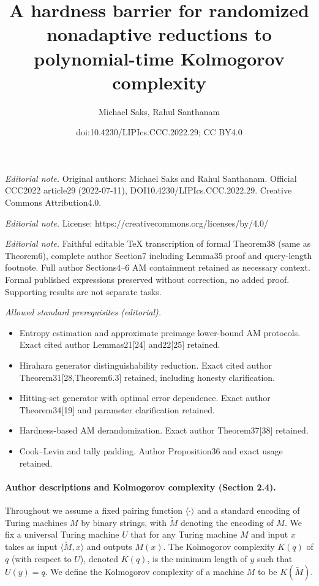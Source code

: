 \documentclass[10pt,a4paper]{article}
\title{A hardness barrier for randomized nonadaptive reductions to polynomial-time Kolmogorov complexity}
\author{Michael Saks, Rahul Santhanam}
\date{doi:10.4230/LIPIcs.CCC.2022.29; CC BY4.0}
\begin{document}
\maketitle
\noindent\textit{Editorial note.} Original authors: Michael Saks and Rahul Santhanam. Official CCC2022 article29 (2022-07-11), DOI10.4230/LIPIcs.CCC.2022.29. Creative Commons Attribution4.0.\par\medskip
\noindent\textit{Editorial note.} License: https://creativecommons.org/licenses/by/4.0/\par\medskip
\noindent\textit{Editorial note.} Faithful editable TeX transcription of formal Theorem38 (same as Theorem6), complete author Section7 including Lemma35 proof and query-length footnote. Full author Sections4--6 AM containment retained as necessary context. Formal published expressions preserved without correction, no added proof. Supporting results are not separate tasks.\par\medskip
\noindent\textit{Allowed standard prerequisites (editorial).}\begin{itemize}
\item Entropy estimation and approximate preimage lower-bound AM protocols. Exact cited author Lemmas21[24] and22[25] retained.
\item Hirahara generator distinguishability reduction. Exact cited author Theorem31[28,Theorem6.3] retained, including honesty clarification.
\item Hitting-set generator with optimal error dependence. Exact author Theorem34[19] and parameter clarification retained.
\item Hardness-based AM derandomization. Exact author Theorem37[38] retained.
\item Cook--Levin and tally padding. Author Proposition36 and exact usage retained.
\end{itemize}\medskip
\paragraph{Author descriptions and Kolmogorov complexity (Section 2.4).}
Throughout we assume a fixed pairing function $\langle\cdot\rangle$ and a standard encoding of Turing machines $M$ by binary strings, with $\widetilde M$ denoting the encoding of $M$.
We fix a universal Turing machine $U$ that for any Turing machine $M$ and input $x$ takes as input $\langle\widetilde M,x\rangle$ and outputs $M(x)$. The Kolmogorov complexity $K(q)$ of $q$ (with respect to $U$), denoted $K(q)$, is the minimum length of $y$ such that $U(y)=q$. We define the Kolmogorov complexity of a machine $M$ to be $K(\widetilde M)$.
\end{document}
